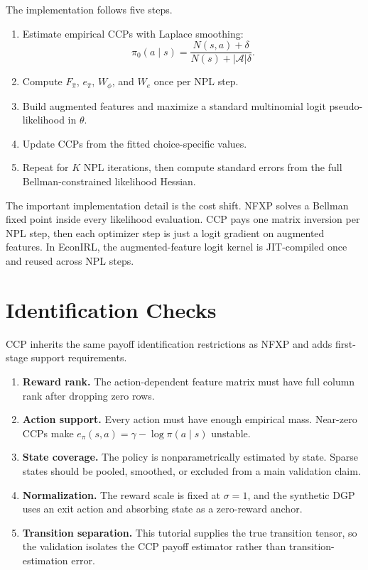 \documentclass[10pt]{article}
\begin{document}
The implementation follows five steps.

\begin{enumerate}
\item Estimate empirical CCPs with Laplace smoothing:
\[
\hat\pi_0(a\mid s)
=
\frac{N(s,a)+\delta}{N(s)+|\mathcal A|\delta}.
\]
\item Compute \(F_{\hat\pi}\), \(e_{\hat\pi}\), \(W_\phi\), and \(W_e\) once
per NPL step.
\item Build augmented features and maximize a standard multinomial logit
pseudo-likelihood in \(\theta\).
\item Update CCPs from the fitted choice-specific values.
\item Repeat for \(K\) NPL iterations, then compute standard errors from the
full Bellman-constrained likelihood Hessian.
\end{enumerate}

The important implementation detail is the cost shift. NFXP solves a Bellman
fixed point inside every likelihood evaluation. CCP pays one matrix inversion
per NPL step, then each optimizer step is just a logit gradient on augmented
features. In EconIRL, the augmented-feature logit kernel is JIT-compiled once
and reused across NPL steps.

\section{Identification Checks}

CCP inherits the same payoff identification restrictions as NFXP and adds
first-stage support requirements.

\begin{enumerate}
\item \textbf{Reward rank.} The action-dependent feature matrix must have full
column rank after dropping zero rows.
\item \textbf{Action support.} Every action must have enough empirical mass.
Near-zero CCPs make \(e_\pi(s,a)=\gamma-\log \pi(a\mid s)\) unstable.
\item \textbf{State coverage.} The policy is nonparametrically estimated by
state. Sparse states should be pooled, smoothed, or excluded from a main
validation claim.
\item \textbf{Normalization.} The reward scale is fixed at \(\sigma=1\), and
the synthetic DGP uses an exit action and absorbing state as a zero-reward
anchor.
\item \textbf{Transition separation.} This tutorial supplies the true
transition tensor, so the validation isolates the CCP payoff estimator rather
than transition-estimation error.
\end{enumerate}
\end{document}
